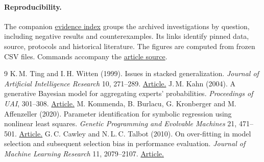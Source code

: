 \documentclass[10pt,a4paper]{article}
\begin{document}
\paragraph{Reproducibility.} The companion \href{https://github.com/damiankucharski/OKAPI/blob/review/native-logit-fitting-and-research-note/docs/research/ensemble-fusion/evidence.md}{evidence index} groups the archived investigations by question, including negative results and counterexamples. Its links identify pinned data, source, protocols and historical literature. The figures are computed from frozen CSV files. Commands accompany the \href{https://github.com/damiankucharski/OKAPI/blob/review/native-logit-fitting-and-research-note/docs/research/ensemble-fusion/index.md}{article source}.

\begin{thebibliography}{9}\small
{} K.\,M. Ting and I.\,H. Witten (1999). Issues in stacked generalization. \textit{Journal of Artificial Intelligence Research} 10, 271--289. \href{https://doi.org/10.1613/jair.594}{Article.}
 J.\,M. Kahn (2004). A generative Bayesian model for aggregating experts' probabilities. \textit{Proceedings of UAI}, 301--308. \href{https://arxiv.org/abs/1207.4144}{Article.}
 M. Kommenda, B. Burlacu, G. Kronberger and M. Affenzeller (2020). Parameter identification for symbolic regression using nonlinear least squares. \textit{Genetic Programming and Evolvable Machines} 21, 471--501. \href{https://doi.org/10.1007/s10710-019-09371-3}{Article.}
 G.\,C. Cawley and N.\,L.\,C. Talbot (2010). On over-fitting in model selection and subsequent selection bias in performance evaluation. \textit{Journal of Machine Learning Research} 11, 2079--2107. \href{https://www.jmlr.org/papers/v11/cawley10a.html}{Article.}
\end{thebibliography}
\end{document}
